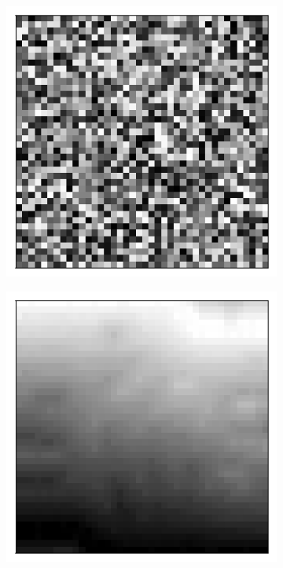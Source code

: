 \documentclass{article}
\begin{document}
\begin{figure}[h]
	\centering
	\begin{subfigure}[t]{0.20\linewidth}
		\centering
		\includegraphics[width = 1.0\linewidth, trim={5 5 5 10}, clip=true]{figures/N20M40l075d05_1_xvals.png}
	\end{subfigure}%
	\hspace{0.15\linewidth}
	\begin{subfigure}[t]{0.20\linewidth}
		\centering
		\includegraphics[width = 1.0\linewidth, trim={5 5 5 10}, clip=true]{figures/N20M40l075d05_2_xvals.png}

\end{subfigure}
\end{figure}
\end{document}
